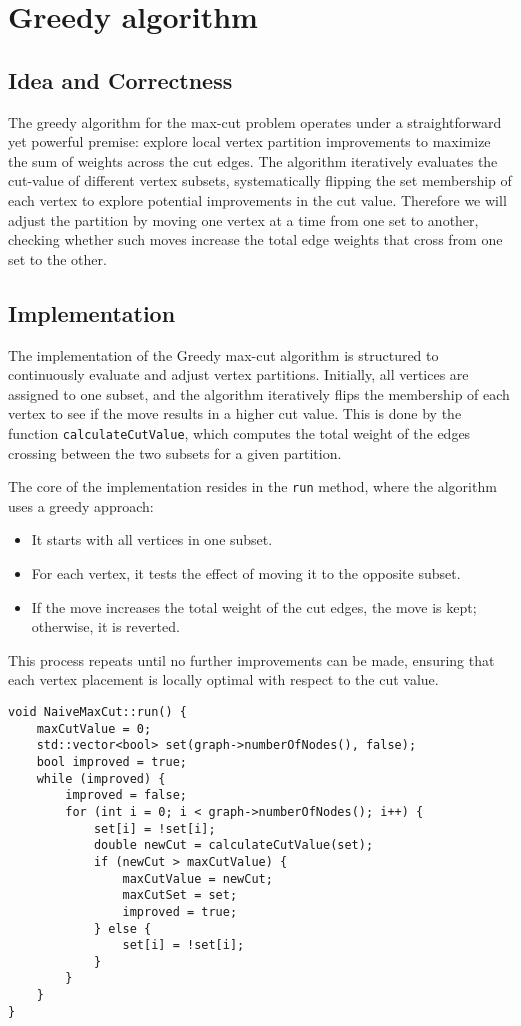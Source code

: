 \section{Greedy algorithm}
\label{sec:greedy}

\subsection{Idea and Correctness}
The greedy algorithm for the max-cut problem operates under a straightforward yet powerful premise: explore local vertex partition improvements to maximize the sum of weights across the cut edges. The algorithm iteratively evaluates the cut-value of different vertex subsets, systematically flipping the set membership of each vertex to explore potential improvements in the cut value. Therefore we will adjust the partition by moving one vertex at a time from one set to another, checking whether such moves increase the total edge weights that cross from one set to the other.

\subsection{Implementation}
The implementation of the Greedy max-cut algorithm is structured to continuously evaluate and adjust vertex partitions. Initially, all vertices are assigned to one subset, and the algorithm iteratively flips the membership of each vertex to see if the move results in a higher cut value. This is done by the function \texttt{calculateCutValue}, which computes the total weight of the edges crossing between the two subsets for a given partition.

The core of the implementation resides in the \texttt{run} method, where the algorithm uses a greedy approach:
\begin{itemize}
    \item It starts with all vertices in one subset.
    \item For each vertex, it tests the effect of moving it to the opposite subset.
    \item If the move increases the total weight of the cut edges, the move is kept; otherwise, it is reverted.
\end{itemize}

This process repeats until no further improvements can be made, ensuring that each vertex placement is locally optimal with respect to the cut value.

\begin{verbatim}
void NaiveMaxCut::run() {
    maxCutValue = 0;
    std::vector<bool> set(graph->numberOfNodes(), false);
    bool improved = true;
    while (improved) {
        improved = false;
        for (int i = 0; i < graph->numberOfNodes(); i++) {
            set[i] = !set[i];
            double newCut = calculateCutValue(set);
            if (newCut > maxCutValue) {
                maxCutValue = newCut;
                maxCutSet = set;
                improved = true;
            } else {
                set[i] = !set[i];
            }
        }
    }
}
\end{verbatim}

